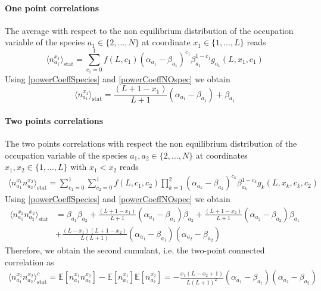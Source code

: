 \documentclass[11pt]{article}
\numberwithin{equation}{section}
\numberwithin{equation}{subsection}
\begin{document}
\paragraph{One point correlations}
The average with respect to the non equilibrium distribution of the occupation variable of the species $a_{1}\in \{2,\ldots,N\}$ at coordinate $x_{1}\in \{1,\ldots,L\}$ reads
\begin{equation}
	\langle n_{a_{1}}^{x_{1}}\rangle_{\text{stat}}=\sum_{c_{1}=0}^{1}f(L,c_{1})(\alpha_{a_{1}}-\beta_{a_{1}})^{c_{1}}\beta_{a_{1}}^{1-c_{1}}g_{a_{1}}(L,x_{1},c_{1})
\end{equation}
Using \eqref{powerCoeffSpecies} and \eqref{powerCoeffNOspec} we obtain 
\begin{equation}\label{one-pts-corr}
\langle n_{a_{1}}^{x_{1}}\rangle_{\text{stat}}=\frac{(L+1-x_{1})}{L+1}(\alpha_{a_{1}}-\beta_{a_{1}})+\beta_{a_{1}}
\end{equation}
\paragraph{Two points correlations}
The two points correlations with respect the non equilibrium distribution of the occupation variable of the species $a_{1},a_{2}\in \{2,\ldots,N\}$ at coordinates $x_{1},x_{2}\in \{1,\ldots,L\}$ with $x_{1}< x_{2}$ reads 
\begin{equation}
	\begin{split}
	\langle n_{a_{1}}^{x_{1}}n_{a_{2}}^{x_{2}}\rangle_{\text{stat}}= \sum_{c_{1}=0}^{1}\sum_{c_{2}=0}^{1}f(L,c_{1},c_{2})\prod_{k=1}^{2}(\alpha_{a_{k}}-\beta_{a_{k}})^{c_{k}}\beta_{a_{k}}^{1-c_{k}}g_{k}(L,x_{k},c_{k},c_{2})
	\end{split}
\end{equation}
Using \eqref{powerCoeffSpecies} and \eqref{powerCoeffNOspec} we obtain 
\begin{equation}
	\begin{split}
	\langle n_{a_{1}}^{x_{2}} n_{a_{2}}^{x_{2}}\rangle_{\text{stat}}&=\beta_{a_{1}}\beta_{a_{2}}+\frac{(L+1-x_{1})}{L+1}(\alpha_{a_{1}}-\beta_{a_{1}})\beta_{a_{2}}+\frac{(L+1-x_{2})}{L+1}(\alpha_{a_{2}}-\beta_{a_{2}})\beta_{a_{1}}\\&+\frac{(L-x_{1})(L+1-x_{2})}{L(L+1)}(\alpha_{a_{1}}-\beta_{a_{1}})(\alpha_{a_{2}}-\beta_{a_{2}})
	\end{split}
\end{equation}
Therefore, we obtain the second cumulant, i.e. the two-point connected correlation as 
\begin{equation}\label{two-pts-corr}
	\begin{split}
		\langle n_{a_{1}}^{x_{2}} n_{a_{2}}^{x_{2}}\rangle_{\text{stat}}^{c}=\mathbb{E}[n_{a_{1}}^{x_{1}}n_{a_{2}}^{x_{2}}]-\mathbb{E}[n_{a_{1}}^{x_{1}}]\mathbb{E}[n_{a_{2}}^{x_{2}}]=-\frac{x_{1}(L-x_{2}+1)}{L(L+1)^{2}}\left(\alpha_{a_{1}}-\beta_{a_{1}}\right)\left(\alpha_{a_{2}}-\beta_{a_{2}}\right)
	\end{split}
\end{equation}
\end{document}
